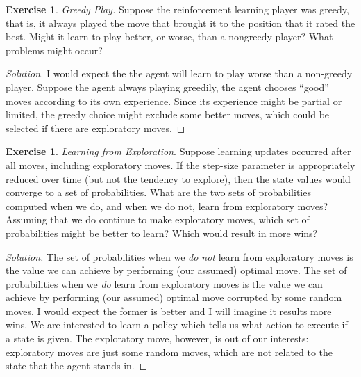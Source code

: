 \documentclass[oneside,11pt]{article}
\theoremstyle{definition}
\newtheorem{exer}[thm]{Exercise}
\newenvironment{solution}
{\renewcommand\qedsymbol{$\blacksquare$}\begin{proof}[Solution]} {\end{proof}}
\begin{document}
\begin{exer}
\emph{Greedy Play.} Suppose the reinforcement learning player was greedy, that is, it always played the move that brought it to the position that it rated the best. Might it learn to play better, or worse, than a nongreedy player? What problems might occur?
\end{exer}

\begin{shaded}
\begin{solution} 
I would expect the the agent will learn to play worse than a non-greedy player. Suppose the agent always playing greedily, the agent chooses ``good'' moves according to its own experience. Since its experience might be partial or limited, the greedy choice might exclude some better moves, which could be selected if there are exploratory moves. 


\end{solution}
\end{shaded}



\begin{exer}
\emph{Learning from Exploration}. Suppose learning updates occurred after all moves, including exploratory moves. If the step-size parameter is appropriately reduced over time (but not the tendency to explore), then the state values would converge to a set of probabilities. What are the two sets of probabilities computed when we do, and when we do not, learn from exploratory moves? Assuming that we do continue to make exploratory moves, which set of probabilities might be better to learn? Which would result in more wins?
\end{exer}

\begin{shaded}
\begin{solution} 

The set of probabilities when we \emph{do not} learn from exploratory moves is the value we can achieve by performing (our assumed) optimal move. The set of probabilities when we \emph{do} learn from exploratory moves is the value we can achieve by performing (our assumed) optimal move corrupted by some random moves. I would expect the former is better and I will imagine it results more wins. We are interested to learn a policy which tells us what action to execute if a state is given. The exploratory move, however, is out of our interests: exploratory moves are just some random moves, which are not related to the state that the agent stands in.
\end{solution}
\end{shaded}
\end{document}
